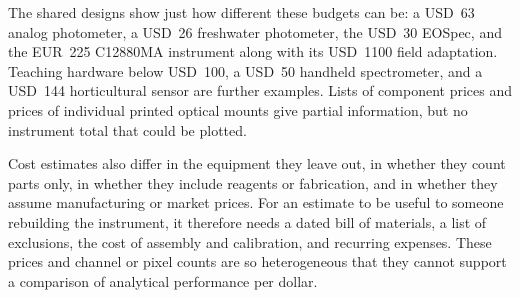 The shared designs show just how different these budgets can be: a USD~63 analog photometer,\citep{prairie2020accurate} a USD~26 freshwater photometer,\citep{cirrone2025low} the USD~30 EOSpec,\citep{feng2021open} and the EUR~225 C12880MA instrument along with its USD~1100 field adaptation.\citep{laganovska2020portable,bulusu2024technical} Teaching hardware below USD~100, a USD~50 handheld spectrometer, and a USD~144 horticultural sensor are further examples.\citep{delmonache2025multipurpose,yu2023open,moralesguerra2026low} Lists of component prices\citep{nguyen2025portable} and prices of individual printed optical mounts\citep{davis2018open} give partial information, but no instrument total that could be plotted.

Cost estimates also differ in the equipment they leave out,\citep{wang2015build} in whether they count parts only,\citep{prairie2020accurate} in whether they include reagents or fabrication,\citep{liao2020portable,habibullah2020cost} and in whether they assume manufacturing or market prices.\citep{aquino2022preliminary,kitic2019new} For an estimate to be useful to someone rebuilding the instrument, it therefore needs a dated bill of materials, a list of exclusions, the cost of assembly and calibration, and recurring expenses. These prices and channel or pixel counts are so heterogeneous that they cannot support a comparison of analytical performance per dollar.
